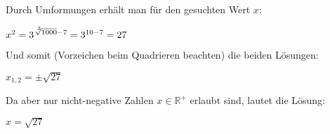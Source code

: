 \item 

Durch Umformungen erhält man für den gesuchten Wert $x$:

$x^2 = 3 ^ {\sqrt[\leftroot{-3}\uproot{3}3]{1000} - 7} = 3^{10-7} = 27$

Und somit (Vorzeichen beim Quadrieren beachten) die beiden Lösungen:

$x_{1,2} = \pm \sqrt{27}$

Da aber nur nicht-negative Zahlen $x \in \mathbb{R}^{+}$ erlaubt sind, lautet die Lösung:

$x = \sqrt{27}$

